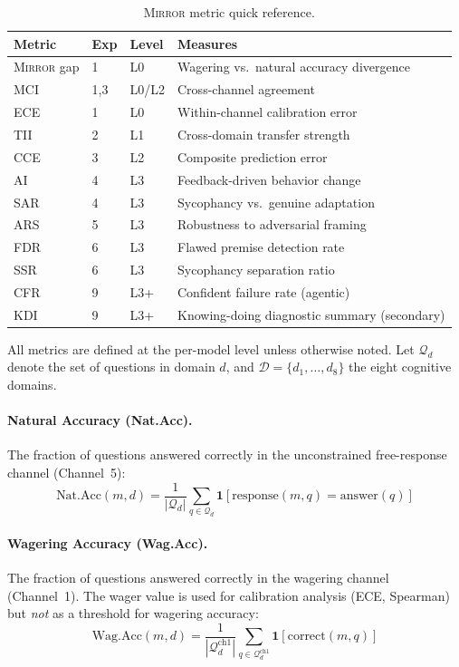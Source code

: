 \documentclass[10pt]{article}
\newcommand{\mirror}{\textsc{Mirror}}
\newcommand{\MCI}{MCI}
\newcommand{\CCE}{CCE}
\newcommand{\ARS}{ARS}
\newcommand{\KDI}{KDI}
\newcommand{\CFR}{CFR}
\newcommand{\SSR}{SSR}
\newcommand{\FDR}{FDR}
\newcommand{\TII}{TII}
\newcommand{\SAR}{SAR}
\newcommand{\AI}{AI}
\begin{document}
\begin{table}[h]
\centering
\caption{\mirror{} metric quick reference.}
\label{tab:metrics}
\small
\begin{tabular}{llll}
\toprule
Metric & Exp & Level & Measures \\
\midrule
\mirror{} gap & 1 & L0 & Wagering vs.\ natural accuracy divergence \\
\MCI{} & 1,3 & L0/L2 & Cross-channel agreement \\
ECE & 1 & L0 & Within-channel calibration error \\
\TII{} & 2 & L1 & Cross-domain transfer strength \\
\CCE{} & 3 & L2 & Composite prediction error \\
\AI{} & 4 & L3 & Feedback-driven behavior change \\
\SAR{} & 4 & L3 & Sycophancy vs.\ genuine adaptation \\
\ARS{} & 5 & L3 & Robustness to adversarial framing \\
\FDR{} & 6 & L3 & Flawed premise detection rate \\
\SSR{} & 6 & L3 & Sycophancy separation ratio \\
\CFR{} & 9 & L3+ & Confident failure rate (agentic) \\
\KDI{} & 9 & L3+ & Knowing-doing diagnostic summary (secondary) \\
\bottomrule
\end{tabular}
\end{table}

All metrics are defined at the per-model level unless otherwise noted. Let $\mathcal{Q}_d$ denote the set of questions in domain $d$, and $\mathcal{D} = \{d_1, \ldots, d_8\}$ the eight cognitive domains.

\paragraph{Natural Accuracy (Nat.Acc).}
The fraction of questions answered correctly in the unconstrained free-response channel (Channel~5):
\begin{equation}
\text{Nat.Acc}(m, d) = \frac{1}{|\mathcal{Q}_d|} \sum_{q \in \mathcal{Q}_d} \mathbf{1}[\text{response}(m, q) = \text{answer}(q)]
\end{equation}

\paragraph{Wagering Accuracy (Wag.Acc).}
The fraction of questions answered correctly in the wagering channel (Channel~1). The wager value is used for calibration analysis (ECE, Spearman) but \textit{not} as a threshold for wagering accuracy:
\begin{equation}
\text{Wag.Acc}(m, d) = \frac{1}{|\mathcal{Q}_d^{\text{ch1}}|} \sum_{q \in \mathcal{Q}_d^{\text{ch1}}} \mathbf{1}[\text{correct}(m, q)]
\end{equation}
\end{document}
